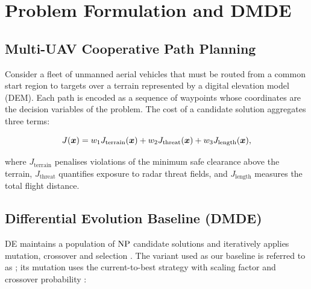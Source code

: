
\section{Problem Formulation and DMDE}
\label{sec:problem}

\subsection{Multi-UAV Cooperative Path Planning}
\label{subsec:problem-def}


Consider a fleet of \Np{} unmanned aerial vehicles that must be routed from a
common start region to \Mt{} targets over a terrain represented by a digital
elevation model (DEM). Each path is encoded as a sequence of waypoints whose
coordinates are the decision variables of the problem. The cost of a candidate
solution aggregates three terms:

\begin{equation}
  J(\bm{x}) = w_{1} J_{\mathrm{terrain}}(\bm{x})
         + w_{2} J_{\mathrm{threat}}(\bm{x})
         + w_{3} J_{\mathrm{length}}(\bm{x}),
  \label{eq:cost}
\end{equation}

where $J_{\mathrm{terrain}}$ penalises violations of the minimum safe clearance
above the terrain, $J_{\mathrm{threat}}$ quantifies exposure to radar threat
fields, and $J_{\mathrm{length}}$ measures the total flight distance.

\subsection{Differential Evolution Baseline (DMDE)}
\label{subsec:dmde}

DE maintains a population of $\mathrm{NP}$ candidate solutions and iteratively applies
mutation, crossover and selection \citep{storn1997de}. The variant used as our
baseline is referred to as \dmde{}; its mutation uses the current-to-best
strategy with scaling factor \Ffactor{} and crossover probability \CR{}:

